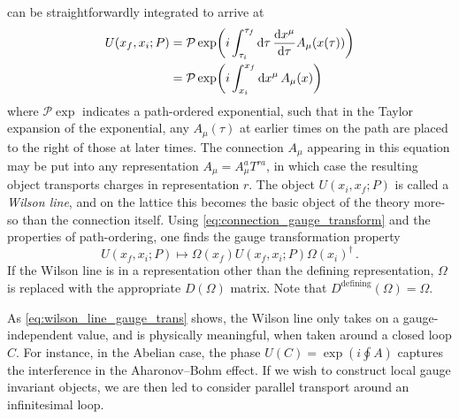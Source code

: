 \documentclass[reprint,superscriptaddress,pra,nofootinbib,preprintnumbers,floatfix]{revtex4-1}
\begin{document}
 can be straightforwardly integrated to arrive at
%
\begin{equation}
\begin{split}
U(x_f,x_i;P) &= \mathcal{P}\exp( i\int_{\tau_i}^{\tau_f} \dd{\tau}\dv{x^\mu}{\tau} A_{\mu}(x(\tau)) ) \\
&= \mathcal{P}\exp( i\int_{x_i}^{x_f} \dd{x^\mu} A_{\mu}(x) )
\end{split}
\end{equation}
%
where $\mathcal{P}\exp$ indicates a path-ordered exponential, such that in the Taylor expansion of the exponential, any $A_\mu(\tau)$ at earlier times on the path are placed to the right of those at later times. 
%
The connection $A_\mu$ appearing in this equation may be put into any representation $A_\mu = A_\mu^a T^{ra}$, in which case the resulting object transports charges in representation $r$. 
%
The object $U(x_i,x_f;P)$ is called a \emph{Wilson line}, and on the lattice this becomes the basic object of the theory more-so than the connection itself.
%
Using \cref{eq:connection_gauge_transform} and the properties of path-ordering, one finds the gauge transformation property
%
\begin{equation}\label{eq:wilson_line_gauge_trans}
    U(x_f, x_i; P) \longmapsto \Omega(x_f) U(x_f, x_i; P) \Omega(x_i)^\dagger \,.
\end{equation}
%
If the Wilson line is in a representation other than the defining representation, $\Omega$ is replaced with the appropriate $D(\Omega)$ matrix. 
%
Note that $D^{\mathrm{defining}}(\Omega)=\Omega $.



As \cref{eq:wilson_line_gauge_trans} shows, the Wilson line only takes on a gauge-independent value, and is physically meaningful, when taken around a closed loop $C$.
%
For instance, in the Abelian case, the phase $U(C) = \exp(i\oint A)$ captures the interference in the Aharonov--Bohm effect. 
%
If we wish to construct local gauge invariant objects, we are then led to consider parallel transport around an infinitesimal loop.
\end{document}
